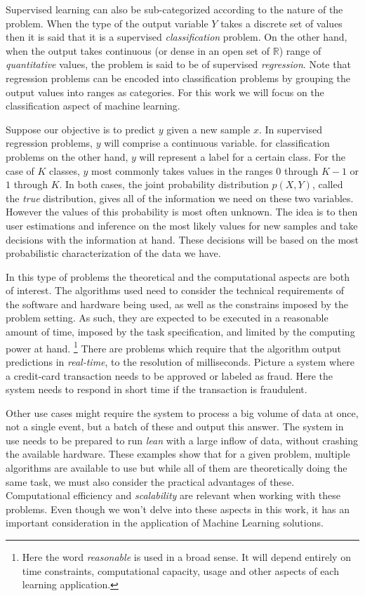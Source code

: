 Supervised learning can also be sub-categorized according to the nature of the problem. When the type of the output variable $Y$ takes a discrete set of values then it is said that it is a supervised \textit{classification} problem. On the other hand, when the output takes continuous (or dense in an open set of $\mathbb{R}$) range of \textit{quantitative} values, the problem is said to be of supervised \textit{regression}. Note that regression problems can be encoded into classification problems by grouping the output values into ranges  as categories. For this work we will focus on the classification aspect of machine learning.

Suppose our objective is to predict $y$ given a new sample $x$. In supervised regression problems, $y$ will comprise a continuous variable. for classification problems on the other hand, $y$ will represent a label for a certain class. For the case of $K$ classes, $y$ most commonly takes values in the ranges $0$ through $K-1$  or $1$ through $K$. In both cases, the joint probability distribution $p(X, Y)$, called the \textit{true} distribution, gives all of the information we need on these two variables. However the values of this probability is most often unknown. The idea is to then user estimations and inference on the most likely values for new samples and take decisions with the information at hand. These decisions will be based on the most probabilistic characterization of the data we have. 

In this type of problems the theoretical and the computational aspects are both of interest. The algorithms used need to consider the technical requirements of the software and hardware being used, as well as the constrains imposed by the problem setting. As such, they are expected to be executed in a reasonable amount of time, imposed by the task specification, and limited by the computing power at hand. \footnote{Here the word \textit{reasonable} is used in a broad sense. It will depend entirely on time constraints, computational capacity, usage and other aspects of each learning application.} There are problems which require that the algorithm output predictions in \textit{real-time}, to the resolution of milliseconds. Picture a system where a credit-card transaction needs to be approved or labeled as fraud. Here the system needs to respond in short time if the transaction is fraudulent. 

Other use cases might require the system to process a big volume of data at once, not a single event, but a batch of these and output this answer. The system in use needs to be prepared to run \textit{lean} with a large inflow of data, without crashing the available hardware.  These examples show that for a given problem, multiple algorithms are available to use but while all of them are theoretically doing the same task, we must also consider the practical advantages of these. Computational efficiency and \textit{scalability} are relevant when working with these problems. Even though we won't delve into these aspects in this work, it has an important consideration in the application of Machine Learning solutions.

